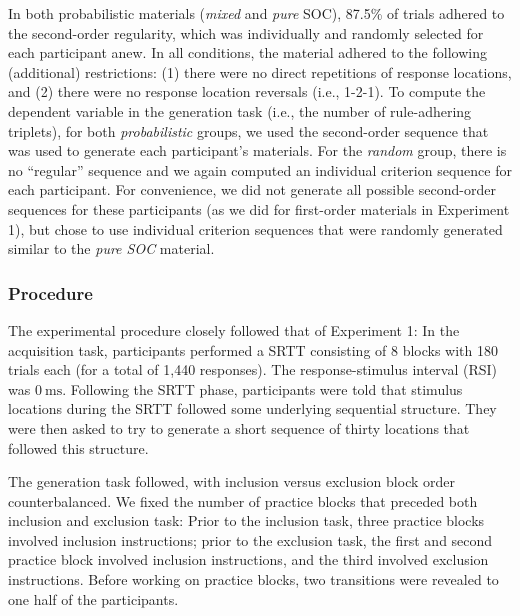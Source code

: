 \documentclass[english,,man]{apa6}
\begin{document}
In both probabilistic materials (\emph{mixed} and \emph{pure} SOC), 87.5\% of trials adhered to the second-order regularity, which was individually and randomly selected for each participant anew.
In all conditions, the material adhered to the following (additional) restrictions:
(1) there were no direct repetitions of response locations, and (2) there were no response location reversals (i.e., 1-2-1).
To compute the dependent variable in the generation task (i.e., the number of rule-adhering triplets), for both \emph{probabilistic} groups, we used the second-order sequence that was used to generate each participant's materials. For the \emph{random} group, there is no \enquote{regular} sequence and we again computed an individual criterion sequence for each participant. For convenience, we did not generate all possible second-order sequences for these participants (as we did for first-order materials in Experiment 1), but chose to use individual criterion sequences that were randomly generated similar to the \emph{pure SOC} material.

\hypertarget{procedure-2}{%
\subsubsection{Procedure}\label{procedure-2}}

The experimental procedure closely followed that of Experiment 1:
In the acquisition task, participants performed a SRTT consisting of 8 blocks with 180 trials each (for a total of 1,440 responses).
The response-stimulus interval (RSI) was \(0~\text{ms}\).
Following the SRTT phase, participants were told that stimulus locations during the SRTT followed some underlying sequential structure.
They were then asked to try to generate a short sequence of thirty locations that followed this structure.

The generation task followed, with inclusion versus exclusion block order counterbalanced.
We fixed the number of practice blocks that preceded both inclusion and exclusion task:
Prior to the inclusion task, three practice blocks involved inclusion instructions;
prior to the exclusion task, the first and second practice block involved inclusion instructions, and the third involved exclusion instructions.
Before working on practice blocks, two transitions were revealed to one half of the participants.
\end{document}

